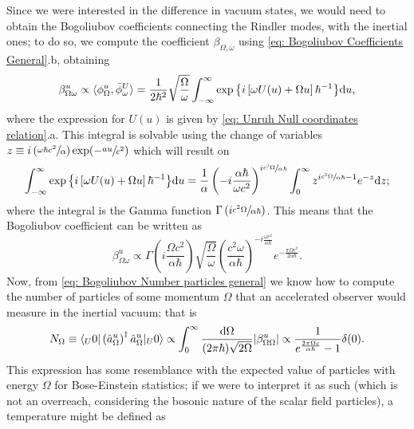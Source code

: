 Since we were interested in the difference in vacuum states, we would need to obtain the Bogoliubov coefficients connecting the Rindler modes, with the inertial ones; to do so, we compute the coefficient $\beta_{\Omega,\omega}$ using \ref{eq: Bogoliubov Coefficients General}.b, obtaining
\begin{equation}
	\beta_{\Omega\omega}^u\propto \langle \phi^u_\Omega,\bar\phi_\omega^{U}\rangle=\frac{1}{2\hbar^2}\sqrt{\frac{\Omega}{\omega}}\int_{-\infty}^\infty\exp{\left\{i\left[\omega U(u)+\Omega u\right]\hbar^{-1}\right\}}\text{d} u,
\end{equation}
where the expression for $U(u)$ is given by \ref{eq: Unruh Null coordinates relation}.a. This integral is solvable using the change of variables $z\equiv i\left(\sfrac{\omega\hbar c^2}{\alpha}\right)\exp{\!\left(-\sfrac{a u}{c^2}\right)}$ which will result on
\begin{equation}
	\int_{-\infty}^\infty\exp{\left\{i\left[\omega U(u)+\Omega u\right]\hbar^{-1}\right\}}\text{d} u=\frac{1}{\alpha}\left(-i\frac{\alpha\hbar}{\omega c^2}\right)^{i\sfrac{c^2\Omega}{\alpha\hbar}}\int^\infty_0z^{i\sfrac{c^2\Omega}{\alpha\hbar}-1}e^{-z}\text{d} z;
\end{equation}
where the integral is the Gamma function $\Gamma\left(i\sfrac{c^2\Omega}{\alpha\hbar}\right)$. This means that the Bogoliubov coefficient can be written as
\begin{equation}
	\beta_{\Omega\omega}^u\propto \Gamma\left(i\frac{\Omega c^2}{\alpha\hbar }\right)\sqrt{\frac{\Omega}{\omega}}\left(\frac{c^2\omega}{\alpha\hbar }\right)^{-i\frac{\omega c^2}{\alpha\hbar}}e^{-\frac{\pi\Omega c^2}{2\alpha\hbar}}.
\end{equation}
Now, from \ref{eq: Bogoliubov Number particles general} we know how to compute the number of particles of some momentum $\Omega$ that an accelerated observer would measure in the inertial vacuum; that is
\begin{equation}\label{eq: Bose Distribution Unruh}
	N_\Omega\equiv\langle_U 0|\left(\hat{a}_\Omega^u\right)^\dagger\hat{a}^u_\Omega|_U0\rangle\propto\int_0^\infty\frac{\text{d}\Omega}{(2\pi\hbar)\sqrt{2\Omega}}|\beta^u_{\Omega\Omega}|\propto\frac{1}{e^{\frac{2\pi\Omega c}{\alpha\hbar}}-1}\delta(0).
\end{equation}
This expression has some resemblance with the expected value of particles with energy $\Omega$ for Bose-Einstein statistics; if we were to interpret it as such (which is not an overreach, considering the bosonic nature of the scalar field particles), a temperature might be defined as

